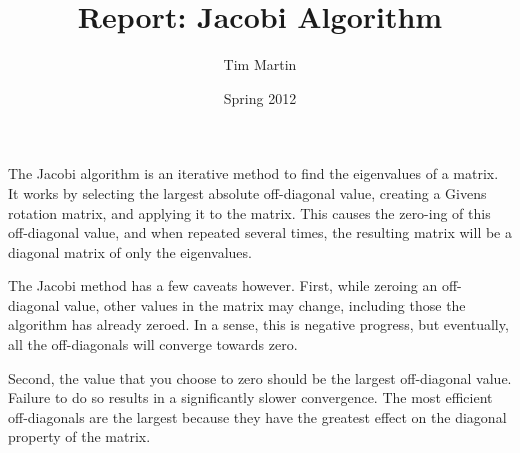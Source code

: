 \documentclass[12pt,letterpaper]{article}
\title{Report: Jacobi Algorithm}
\author{Tim Martin}
\date{Spring 2012}
\begin{document}
\maketitle

The Jacobi algorithm is an iterative method to find the eigenvalues of a matrix.
It works by selecting the largest absolute off-diagonal value, creating a Givens
rotation matrix, and applying it to the matrix. This causes the zero-ing of this
off-diagonal value, and when repeated several times, the resulting matrix will
be a diagonal matrix of only the eigenvalues.

The Jacobi method has a few caveats however. First, while zeroing an
off-diagonal value, other values in the matrix may change, including those the
algorithm has already zeroed. In a sense, this is negative progress, but
eventually, all the off-diagonals will converge towards zero.

Second, the value that you choose to zero should be the largest off-diagonal
value. Failure to do so results in a significantly slower convergence. The most
efficient off-diagonals are the largest because they have the greatest effect on
the diagonal property of the matrix.
\end{document}
